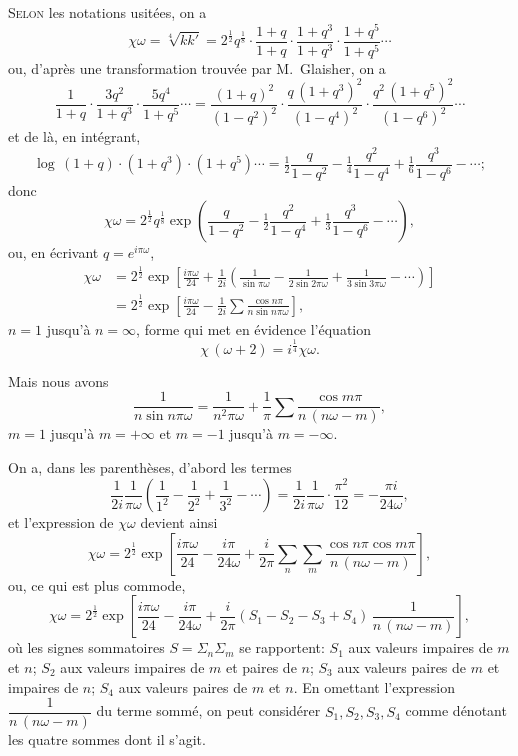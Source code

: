 \documentclass[11pt]{article}
\begin{document}
\textsc{Selon} les notations usit\'ees, on a
\[
\chi\omega = \sqrt[4]{k k'} = 2^{\tfrac{1}{2}} q^{\tfrac{1}{8}}\cdot \frac{1 + q}{1 + q}\cdot \frac{1 + q^3}{1 + q^3}\cdot \frac{1 + q^5}{1 + q^5}\cdots
\]
ou, d'apr\`es une transformation trouv\'ee par M.\ Glaisher, on a
\[
\frac{1}{1 + q}\cdot\frac{3 q^2}{1 + q^3}\cdot\frac{5 q^4}{1 + q^5}\cdots = \frac{(1 + q)^2}{(1 - q^2)^2}\cdot\frac{q\,(1 + q^3)^2}{(1 - q^4)^2}\cdot\frac{q^2\,(1 + q^5)^2}{(1 - q^6)^2}\cdots
\]
et de l\`a, en int\'egrant,
\[
\log\,(1 + q)\cdot (1 + q^3)\cdot (1 + q^5)\cdots = \tfrac{1}{2}\frac{q}{1 - q^2} - \tfrac{1}{4}\frac{q^2}{1 - q^4} + \tfrac{1}{6}\frac{q^3}{1 - q^6} - \cdots;
\]
donc
\[
\chi\omega = 2^{\tfrac{1}{2}} q^{\tfrac{1}{8}}\exp\!\left(\frac{q}{1 - q^2} - \tfrac{1}{2}\frac{q^2}{1 - q^4} + \tfrac{1}{3}\frac{q^3}{1 - q^6} - \cdots\right),
\]
ou, en \'ecrivant $q = e^{i\pi\omega}$,
\begin{align*}
\chi\omega &= 2^{\tfrac{1}{2}}\exp\!\left[\frac{i\pi\omega}{24} + \frac{1}{2 i}\!\left(\frac{1}{\sin \pi\omega} - \frac{1}{2 \sin 2\pi\omega} + \frac{1}{3 \sin 3\pi\omega} - \cdots\right)\right] \\
            &= 2^{\tfrac{1}{2}}\exp\!\left[\frac{i\pi\omega}{24} - \frac{1}{2 i}\sum \frac{\cos n\pi}{n \sin n\pi\omega}\right],
\end{align*}
$n = 1$ jusqu'\`a $n = \infty$, forme qui met en \'evidence l'\'equation
\[
\chi\,(\omega + 2) = i^{\tfrac{1}{4}}\chi\omega.
\]

Mais nous avons
\[
\frac{1}{n\sin n\pi\omega} = \frac{1}{n^2 \pi\omega} + \frac{1}{\pi}\sum \frac{\cos m\pi}{n\,(n\omega - m)},
\]
$m = 1$ jusqu'\`a $m = +\infty$ et $m = -1$ jusqu'\`a $m = -\infty$.

On a, dans les parenth\`eses, d'abord les termes
\[
\frac{1}{2 i}\frac{1}{\pi\omega}\!\left(\frac{1}{1^2} - \frac{1}{2^2} + \frac{1}{3^2} - \cdots\right) = \frac{1}{2 i}\frac{1}{\pi\omega}\cdot\frac{\pi^2}{12} = -\frac{\pi i}{24 \omega},
\]
et l'expression de $\chi\omega$ devient ainsi
\[
\chi\omega = 2^{\tfrac{1}{2}}\exp\!\left[\frac{i\pi\omega}{24} - \frac{i\pi}{24\omega} + \frac{i}{2\pi}\sum_n \sum_m \frac{\cos n\pi\cos m\pi}{n\,(n\omega - m)}\right],
\]
ou, ce qui est plus commode,
\[
\chi\omega = 2^{\tfrac{1}{2}}\exp\!\left[\frac{i\pi\omega}{24} - \frac{i\pi}{24\omega} + \frac{i}{2\pi}(S_1 - S_2 - S_3 + S_4)\,\frac{1}{n\,(n\omega - m)}\right],
\]
o\`u les signes sommatoires $S = \Sigma_n \Sigma_m$ se rapportent: $S_1$ aux valeurs impaires de $m$ et $n$; $S_2$ aux valeurs impaires de $m$ et paires de $n$; $S_3$ aux valeurs paires de $m$ et impaires de $n$; $S_4$ aux valeurs paires de $m$ et $n$.  En omettant l'expression $\dfrac{1}{n\,(n\omega - m)}$ du terme somm\'e, on peut consid\'erer $S_1, S_2, S_3, S_4$ comme d\'enotant les quatre sommes dont il s'agit.
\end{document}
